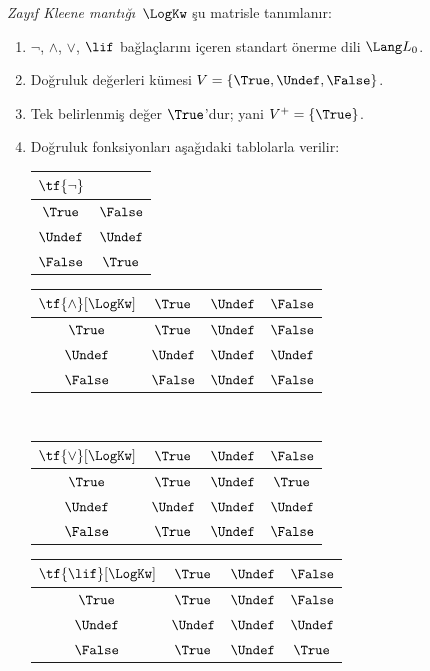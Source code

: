 \documentclass[../../../include/open-logic-section]{subfiles}
\begin{document}
\begin{defn}
\emph{Zayıf Kleene mantığı}~$\LogKw$ şu matrisle tanımlanır:
\begin{enumerate}
  \item $\lnot$, $\land$, $\lor$, $\lif$ bağlaçlarını içeren standart
  önerme dili $\Lang L_0$.
  \item Doğruluk değerleri kümesi $V = \{\True, \Undef, \False\}$.
  \item Tek belirlenmiş değer $\True$'dur; yani $V^+ = \{\True\}$.
  \item Doğruluk fonksiyonları aşağıdaki tablolarla verilir:
  \begin{center}
    \begin{tabular}{c|c} 
      $\tf{\lnot}$ & \\ 
      \hline  
      $\True$ & $\False$ \\ 
      $\Undef$ & $\Undef$ \\
      $\False$ & $\True$ 
    \end{tabular}
    \quad
    \begin{tabular}{c|ccc} 
      $\tf{\land}[\LogKw]$ & $\True$ & $\Undef$ & $\False$ \\ 
      \hline 
      $\True$ & $\True$ & $\Undef$ & $\False$ \\ 
      $\Undef$ & $\Undef$ & $\Undef$ & $\Undef$\\ 
      $\False$ & $\False$ & $\Undef$ & $\False$ 
    \end{tabular}
    \\[2ex]
    \begin{tabular}{c|ccc} 
      $\tf{\lor}[\LogKw]$ & $\True$ & $\Undef$ & $\False$ \\ 
      \hline 
      $\True$ & $\True$ & $\Undef$ & $\True$ \\ 
      $\Undef$ & $\Undef$ & $\Undef$ & $\Undef$ \\
      $\False$ & $\True$ & $\Undef$ & $\False$ 
    \end{tabular}
    \quad
    \begin{tabular}{c|ccc} 
      $\tf{\lif}[\LogKw]$ & $\True$ & $\Undef$ & $\False$ \\ 
      \hline 
      $\True$ & $\True$ & $\Undef$ & $\False$ \\ 
      $\Undef$ & $\Undef$ & $\Undef$ & $\Undef$  \\ 
      $\False$ & $\True$ & $\Undef$ & $\True$ 
    \end{tabular}
  \end{center} 
\end{enumerate}
\end{defn}
\end{document}
